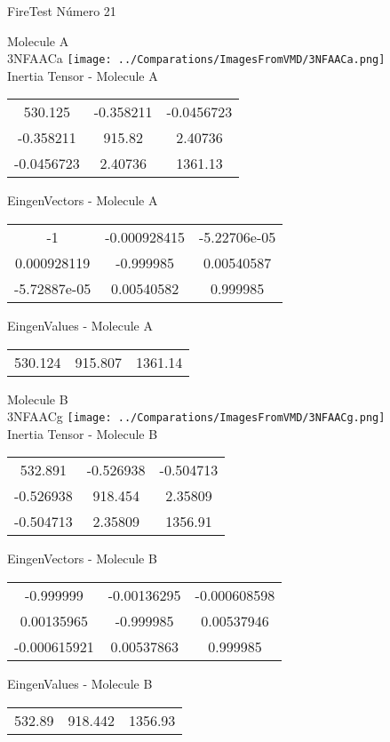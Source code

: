 \vtab[-2cm]
\begin{center}
{\large FireTest \tab Número 21}
\end{center}
\begin{multicols}{2}
\begin{center}

Molecule A \\ 
3NFAACa
\texttt{[image: ../Comparations/ImagesFromVMD/3NFAACa.png]}
\\
Inertia Tensor - Molecule A \\
\vtab

\begin{tabular}{|c c c|}
530.125	 & 	-0.358211	 & 	-0.0456723	 \\
-0.358211	 & 	915.82	 & 	2.40736	 \\
-0.0456723	 & 	2.40736	 & 	1361.13
\end{tabular}

\vtab
 EingenVectors - Molecule A     \\
\vtab
\begin{tabular}{|c c c|}
-1	 & 	-0.000928415	 & 	-5.22706e-05	 \\
0.000928119	 & 	-0.999985	 & 	0.00540587	 \\
-5.72887e-05	 & 	0.00540582	 & 	0.999985
\end{tabular}

\vtab
 EingenValues - Molecule A     \\
\vtab
\begin{tabular}{|c c c|}
530.124	 & 	915.807	 & 	1361.14	 \\
\end{tabular}
\columnbreak

Molecule B \\ 
3NFAACg
\texttt{[image: ../Comparations/ImagesFromVMD/3NFAACg.png]}
\\
Inertia Tensor - Molecule B \\
\vtab

\begin{tabular}{|c c c|}
532.891	 & 	-0.526938	 & 	-0.504713	 \\
-0.526938	 & 	918.454	 & 	2.35809	 \\
-0.504713	 & 	2.35809	 & 	1356.91
\end{tabular}

\vtab
 EingenVectors - Molecule B     \\
\vtab
\begin{tabular}{|c c c|}
-0.999999	 & 	-0.00136295	 & 	-0.000608598	 \\
0.00135965	 & 	-0.999985	 & 	0.00537946	 \\
-0.000615921	 & 	0.00537863	 & 	0.999985
\end{tabular}

\vtab
 EingenValues - Molecule B     \\
\vtab
\begin{tabular}{|c c c|}
532.89	 & 	918.442	 & 	1356.93	 \\
\end{tabular}

\end{center}
\end{multicols}
